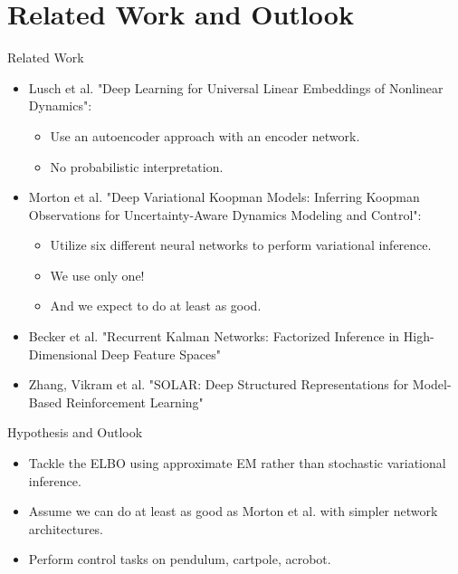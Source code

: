 \documentclass[
	aspectratio=43,
	color={accentcolor=1c},
	logo=false,
	colorframetitle=true
]{tudabeamer}
\begin{document}
	\section{Related Work and Outlook}
		\begin{frame}{Related Work}
			\begin{itemize}
				\item<+-> Lusch et al. "Deep Learning for Universal Linear Embeddings of Nonlinear Dynamics":
					\begin{itemize}
						\item Use an autoencoder approach with an encoder network.
						\item No probabilistic interpretation.
					\end{itemize}
				\item<+-> Morton et al. "Deep Variational Koopman Models: Inferring Koopman Observations for Uncertainty-Aware Dynamics Modeling and Control":
					\begin{itemize}
						\item Utilize six different neural networks to perform variational inference.
						\item We use only one!
						\item And we expect to do at least as good.
					\end{itemize}
				\item<+-> Becker et al. "Recurrent Kalman Networks: Factorized Inference in High-Dimensional Deep Feature Spaces"
				\item<+-> Zhang, Vikram et al. "SOLAR: Deep Structured Representations for Model-Based Reinforcement Learning"
			\end{itemize}
		\end{frame}

		\begin{frame}{Hypothesis and Outlook}
			\begin{itemize}
				\item Tackle the ELBO using approximate EM rather than stochastic variational inference.
				\item Assume we can do at least as good as Morton et al. with simpler network architectures.
				\item Perform control tasks on pendulum, cartpole, acrobot.
			\end{itemize}
		\end{frame}





	\appendix
\end{document}
